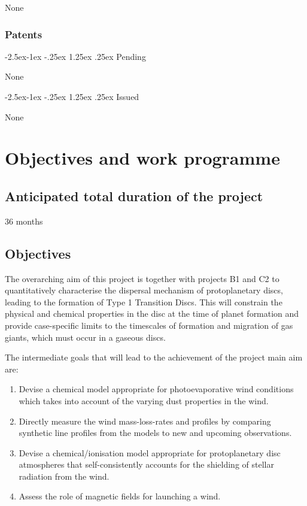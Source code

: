 \documentclass[10pt,fleqn,twoside]{article}
\makeatletter
\newcommand{\Tcol}{\color{blue}}
\renewcommand\paragraph{\@startsection{paragraph}{4}{\z@}%
            {-2.5ex\@plus -1ex \@minus -.25ex}%
            {1.25ex \@plus .25ex}%
            {\normalfont\normalsize\bfseries}}
\makeatother
\begin{document}
None

\subsubsection{\Tcol Patents}

\paragraph{\Tcol Pending}

None 

\paragraph{\Tcol Issued}

None 

\section{\Tcol Objectives and work programme}
\renewcommand{\leftmark}{\sc Objectives and work programme}

\subsection{\Tcol Anticipated total duration of the project}

36 months

\subsection{\Tcol Objectives}

The overarching aim of this project is together with projects B1 and C2 to quantitatively characterise the dispersal mechanism of protoplanetary discs, leading to the formation of Type 1 Transition Discs. This will constrain the physical and chemical properties in the disc at the time of planet formation and provide case-specific limits to the timescales of formation and migration of gas giants, which must occur in a gaseous discs. 

The intermediate goals that will lead to the achievement of the project main aim are: 

\begin{enumerate}

\item Devise a chemical model appropriate for photoevaporative wind conditions which takes into account of the varying dust properties in the wind. 
\item Directly measure the wind mass-loss-rates and profiles by comparing synthetic line profiles from the models to new and upcoming observations.
\item Devise a chemical/ionisation model appropriate for protoplanetary disc atmospheres that self-consistently accounts for the shielding of stellar radiation from the wind. 
\item Assess the role of magnetic fields for launching a wind.
\end{enumerate}
\end{document}
